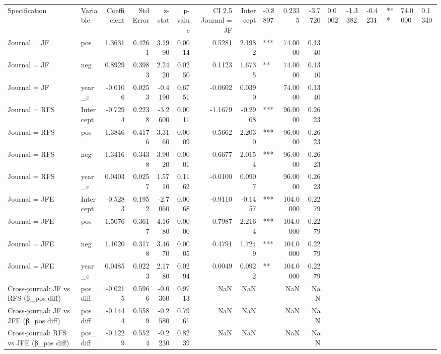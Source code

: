 \begin{tabular}{llrrrrrrlrr}
\toprule
Specification & Variable & Coefficient & Std Error & z-stat & p-value & CI 2.5%
\midrule
Journal = JF & Intercept & -0.8807 & 0.2335 & -3.7720 & 0.0002 & -1.3382 & -0.4231 & *** & 74.0000 & 0.1340 \\
Journal = JF & pos & 1.3631 & 0.4261 & 3.1990 & 0.0014 & 0.5281 & 2.1982 & *** & 74.0000 & 0.1340 \\
Journal = JF & neg & 0.8929 & 0.3983 & 2.2420 & 0.0250 & 0.1123 & 1.6735 & ** & 74.0000 & 0.1340 \\
Journal = JF & year_c & -0.0106 & 0.0253 & -0.4190 & 0.6751 & -0.0602 & 0.0390 &  & 74.0000 & 0.1340 \\
Journal = RFS & Intercept & -0.7294 & 0.2238 & -3.2600 & 0.0011 & -1.1679 & -0.2908 & *** & 96.0000 & 0.2623 \\
Journal = RFS & pos & 1.3846 & 0.4176 & 3.3160 & 0.0009 & 0.5662 & 2.2030 & *** & 96.0000 & 0.2623 \\
Journal = RFS & neg & 1.3416 & 0.3438 & 3.9020 & 0.0001 & 0.6677 & 2.0154 & *** & 96.0000 & 0.2623 \\
Journal = RFS & year_c & 0.0403 & 0.0257 & 1.5710 & 0.1162 & -0.0100 & 0.0907 &  & 96.0000 & 0.2623 \\
Journal = JFE & Intercept & -0.5283 & 0.1952 & -2.7060 & 0.0068 & -0.9110 & -0.1457 & *** & 104.0000 & 0.2279 \\
Journal = JFE & pos & 1.5076 & 0.3617 & 4.1680 & 0.0000 & 0.7987 & 2.2164 & *** & 104.0000 & 0.2279 \\
Journal = JFE & neg & 1.1020 & 0.3178 & 3.4670 & 0.0005 & 0.4791 & 1.7249 & *** & 104.0000 & 0.2279 \\
Journal = JFE & year_c & 0.0485 & 0.0223 & 2.1780 & 0.0294 & 0.0049 & 0.0922 & ** & 104.0000 & 0.2279 \\
Cross-journal: JF vs RFS (β_pos diff) & pos_diff & -0.0215 & 0.5966 & -0.0360 & 0.9713 & NaN & NaN &  & NaN & NaN \\
Cross-journal: JF vs JFE (β_pos diff) & pos_diff & -0.1444 & 0.5589 & -0.2580 & 0.7961 & NaN & NaN &  & NaN & NaN \\
Cross-journal: RFS vs JFE (β_pos diff) & pos_diff & -0.1229 & 0.5524 & -0.2230 & 0.8239 & NaN & NaN &  & NaN & NaN \\
\bottomrule
\end{tabular}
